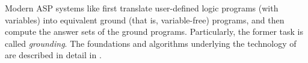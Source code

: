 Modern ASP systems like {\clingo} first translate
user-defined logic programs (with variables) into 
equivalent ground (that is, variable-free) programs, 
and then compute the answer sets of the ground programs.
Particularly, the former task is called \emph{grounding}.
The foundations and algorithms underlying the technology of {\clingo}
are described in detail in \citep{gekakasc12a}.

